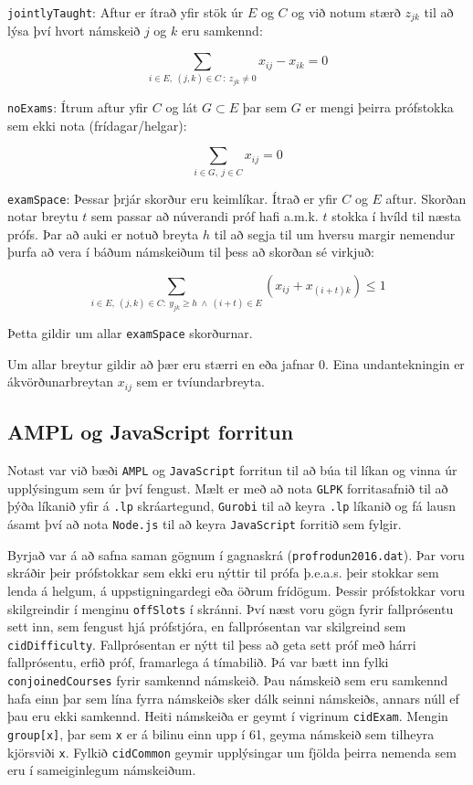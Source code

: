 \documentclass[12pt]{article}
\begin{document}
\texttt{jointlyTaught}: Aftur er ítrað yfir stök úr $ E $ og $ C $ og við notum stærð $ z_{jk} $ til að lýsa því hvort námskeið $ j $ og $ k $ eru samkennd:

$$\sum_{i \in E , ~ (j,k) \in C ~ : ~ z_{jk} \neq 0 } x_{ij} - x_{ik} = 0$$

\texttt{noExams}: Ítrum aftur yfir $ C $ og lát $ G \subset E $ þar sem $ G $ er mengi þeirra prófstokka sem ekki nota (frídagar/helgar):

$$\sum_{i \in G, ~ j \in C} x_{ij} = 0$$

\texttt{examSpace}: Þessar þrjár skorður eru keimlíkar. Ítrað er yfir $ C $ og $ E $ aftur. Skorðan notar breytu $ t $ sem passar að núverandi próf hafi a.m.k. $ t $ stokka í hvíld til næsta prófs. Þar að auki er notuð breyta $ h $ til að segja til um hversu margir nemendur þurfa að vera í báðum námskeiðum til þess að skorðan sé virkjuð:

$$\sum_{i \in E, ~(j,k)\in C: ~y_{jk}  \geq  h ~ \wedge ~ (i+t) \in E} (x_{ij} + x_{(i+t)k}) \leq 1$$

Þetta gildir um allar \texttt{examSpace} skorðurnar. 

\medskip

Um allar breytur gildir að þær eru stærri en eða jafnar 0. Eina undantekningin er ákvörðunarbreytan $ x_{ij} $ sem er tvíundarbreyta.

\newpage

\subsection{AMPL og JavaScript forritun}

Notast var við bæði \texttt{AMPL} og \texttt{JavaScript} forritun til að búa til líkan og vinna úr upplýsingum sem úr því fengust. Mælt er með að nota \texttt{GLPK} forritasafnið til að þýða líkanið yfir á \texttt{.lp} skráartegund, \texttt{Gurobi} til að keyra \texttt{.lp} líkanið og fá lausn ásamt því að nota \texttt{Node.js} til að keyra \texttt{JavaScript} forritið sem fylgir.

\medskip

Byrjað var á að safna saman gögnum í gagnaskrá (\texttt{profrodun2016.dat}).  Þar voru skráðir þeir prófstokkar sem ekki eru nýttir til prófa þ.e.a.s. þeir stokkar sem lenda á helgum, á uppstigningardegi eða öðrum frídögum. Þessir prófstokkar voru skilgreindir í menginu \texttt{offSlots} í skránni. Því næst voru gögn fyrir fallprósentu sett inn, sem fengust hjá prófstjóra, en fallprósentan var skilgreind sem  \texttt{cidDifficulty}.  Fallprósentan er nýtt til þess að geta sett próf með hárri fallprósentu, erfið próf, framarlega á tímabilið. Þá var bætt inn fylki \texttt{conjoinedCourses} fyrir samkennd námskeið. Þau námskeið sem eru samkennd hafa einn þar sem lína fyrra námskeiðs sker dálk seinni námskeiðs, annars núll ef þau eru ekki samkennd. Heiti námskeiða er geymt í vigrinum \texttt{cidExam}. Mengin \texttt{group[x]}, þar sem \texttt{x} er á bilinu einn upp í 61, geyma námskeið sem tilheyra kjörsviði \texttt{x}.   Fylkið \texttt{cidCommon} geymir upplýsingar um fjölda þeirra nemenda sem eru í sameiginlegum námskeiðum. 
\end{document}
